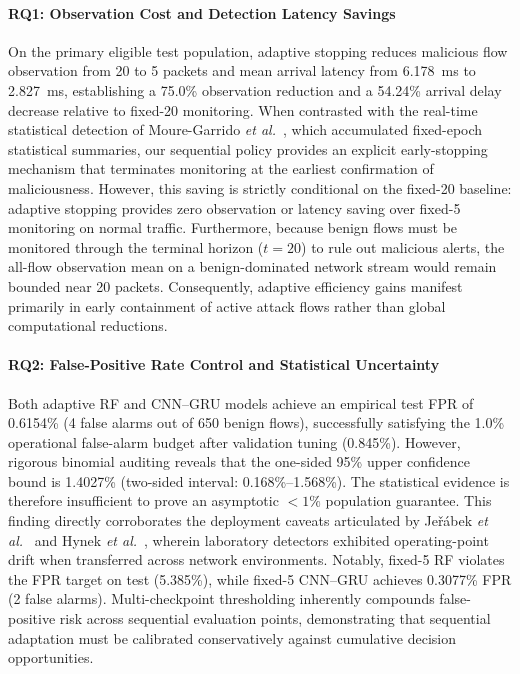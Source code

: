 \documentclass[conference]{IEEEtran}
\begin{document}
\paragraph{RQ1: Observation Cost and Detection Latency Savings}
On the primary eligible test population, adaptive stopping reduces malicious flow observation from 20 to 5 packets and mean arrival latency from 6.178~ms to 2.827~ms, establishing a 75.0\% observation reduction and a 54.24\% arrival delay decrease relative to fixed-20 monitoring. When contrasted with the real-time statistical detection of Moure-Garrido \emph{et al.}~\cite{moure,moure2022}, which accumulated fixed-epoch statistical summaries, our sequential policy provides an explicit early-stopping mechanism that terminates monitoring at the earliest confirmation of maliciousness. However, this saving is strictly conditional on the fixed-20 baseline: adaptive stopping provides zero observation or latency saving over fixed-5 monitoring on normal traffic. Furthermore, because benign flows must be monitored through the terminal horizon ($t=20$) to rule out malicious alerts, the all-flow observation mean on a benign-dominated network stream would remain bounded near 20 packets. Consequently, adaptive efficiency gains manifest primarily in early containment of active attack flows rather than global computational reductions.

\paragraph{RQ2: False-Positive Rate Control and Statistical Uncertainty}
Both adaptive RF and CNN--GRU models achieve an empirical test FPR of 0.6154\% (4 false alarms out of 650 benign flows), successfully satisfying the 1.0\% operational false-alarm budget after validation tuning (0.845\%). However, rigorous binomial auditing reveals that the one-sided 95\% upper confidence bound is 1.4027\% (two-sided interval: 0.168\%--1.568\%). The statistical evidence is therefore insufficient to prove an asymptotic $<1\%$ population guarantee. This finding directly corroborates the deployment caveats articulated by Je\v{r}\'abek \emph{et al.}~\cite{jerabek} and Hynek \emph{et al.}~\cite{hynek2022}, wherein laboratory detectors exhibited operating-point drift when transferred across network environments. Notably, fixed-5 RF violates the FPR target on test (5.385\%), while fixed-5 CNN--GRU achieves 0.3077\% FPR (2 false alarms). Multi-checkpoint thresholding inherently compounds false-positive risk across sequential evaluation points, demonstrating that sequential adaptation must be calibrated conservatively against cumulative decision opportunities.
\end{document}
